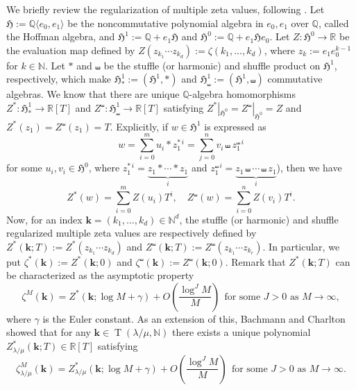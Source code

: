 \documentclass[12pt]{amsart}%
\theoremstyle{definition}
\DeclareMathOperator{\T}{T}
\newcommand{\bk}{\boldsymbol k}
\begin{document}
We briefly review the regularization of multiple zeta values, following \cite{ikz06}. 
Let $\mathfrak{H}:=\mathbb{Q}\langle e_0,e_1\rangle$ be the
noncommutative polynomial algebra in $e_0,e_1$ over $\mathbb{Q}$, called the Hoffman algebra, and 
$\mathfrak{H}^1:=\mathbb{Q}+ e_1\mathfrak{H}$ and $\mathfrak{H}^0:=\mathbb{Q}+ e_1\mathfrak{H}e_0$. Let $Z:\mathfrak{H}^0\to\mathbb{R}$ be the evaluation map defined by $Z(z_{k_1}\cdots z_{k_d}):=\zeta(k_1,\ldots,k_d)$,
where $z_k:=e_1e^{k-1}_0$ for $k\in\mathbb{N}$.
Let $\ast$ and $\shuffle$ be the stuffle (or harmonic) and shuffle product on $\mathfrak{H}^1$, respectively, which make $\mathfrak{H}^1_{\ast}:=(\mathfrak{H}^1,\ast)$ and $\mathfrak{H}^1_{\shuffle}:=(\mathfrak{H}^1,\shuffle)$ commutative algebras. We know that there are unique $\mathbb{Q}$-algebra homomorphisms $Z^{\ast}:\mathfrak{H}^1_{\ast}\to\mathbb{R}[T]$ and $Z^{\shuffle}:\mathfrak{H}^1_{\shuffle}\to\mathbb{R}[T]$ satisfying  
$Z^{\ast}|_{\mathfrak{H}^0}=Z^{\shuffle}|_{\mathfrak{H}^0}=Z$ and $Z^{\ast}(z_1)=Z^{\shuffle}(z_1)=T$. 
Explicitly, if $w\in \mathfrak{H}^{1}$ is expressed as 
\[
w
=\sum^m_{i=0}u_i\ast z^{\ast \,i}_1
=\sum^n_{j=0}v_i\shuffle z^{\shuffle \,i}_1
\]
for some $u_i,v_i\in \mathfrak{H}^{0}$, 
where $z^{\ast \,i}_1=\underbrace{z_1 \ast \cdots \ast  z_1}_{i}$ and $z^{\shuffle \,i}_1=\underbrace{z_1 \shuffle \cdots \shuffle z_1}_{i}$), then we have 
\begin{equation}
\label{for:regularizations}
Z^{\ast}(w)=\sum^m_{i=0}Z(u_i)T^i,\quad 
Z^{\shuffle}(w)=\sum^n_{i=0}Z(v_i)T^i.
\end{equation}
Now, for an index $\bk=(k_1,\ldots,k_d)\in \mathbb{N}^d$, 
the stuffle (or harmonic) and shuffle regularized multiple zeta values are respectively defined by 
$Z^{\ast}(\bk;T):=Z^{\ast}(z_{k_1}\cdots z_{k_d})$ and $Z^{\shuffle}(\bk;T):=Z^{\shuffle}(z_{k_1}\cdots z_{k_r})$. 
In particular, we put 
$\zeta^{\ast}(\bk):=Z^{\ast}(\bk;0)$ and 
$\zeta^{\shuffle}(\bk):=Z^{\shuffle}(\bk;0)$.
Remark that $Z^{\ast}(\bk;T)$ can be characterized as the asymptotic property
\[
 \zeta^M(\bk)
=Z^{\ast}(\bk;\log M+\gamma)+O\left(\frac{\log^J M}{M}\right)
\ \ \text{for some $J>0$ as $M\to\infty$},
\]
where $\gamma$ is the Euler constant.
As an extension of this, 
Bachmann and Charlton \cite[Lemma~3.1]{bc} showed that 
for any $\bk\in \T(\lambda/\mu,\mathbb{N})$  
there exists a unique polynomial
$Z^{\ast}_{\lambda/\mu}(\bk;T)\in\mathbb{R}[T]$ satisfying  
\[
 \zeta^{M}_{\lambda/\mu}(\bk)
=Z^{\ast}_{\lambda/\mu}(\bk;\log M+\gamma)+O\left(\frac{\log^J M}{M}\right)
\ \ \text{for some $J>0$ as $M\to\infty$}.
\]
\end{document}
